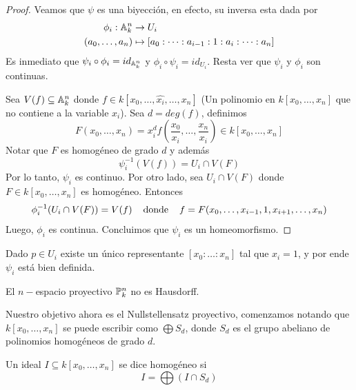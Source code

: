 \documentclass[11pt]{article}
\begin{document}
\begin{proof}
    Veamos que $\psi$ es una biyección, en efecto, su inversa esta dada por
    \begin{align*}
        \phi_{i}:\A_{k}^{n} &\to U_{i} \\
        (a_{0},\dots,a_{n}) &\mapsto [a_{0}:\dots:a_{i-1}:1:a_{i}:\dots:a_{n}]
    \end{align*}
    Es inmediato que $\psi_{i}\circ\phi_{i}=id_{\A_{k}^{n}}$ y $\phi_{i}\circ\psi_{i}=id_{U_{i}}$.
    Resta ver que $\psi_{i}$ y $\phi_{i}$ son continuas.

    \vspace{1mm}
    Sea $V(f)\subseteq\A_{k}^{n}$ donde $f\in k[x_{0},\dots,\hat{x_{i}},\dots,x_{n}]$ (Un 
    polinomio en $k[x_{0},\dots,x_{n}]$ que no contiene a la variable $x_{i}$). Sea $d=deg(f)$, 
    definimos
    \begin{equation*}
        F(x_{0},\dots,x_{n})
        =x_{i}^{d}f\left(\frac{x_{0}}{x_{i}},\dots,\frac{x_{n}}{x_{i}}\right)
        \in k[x_{0},\dots,x_{n}]
    \end{equation*}
    Notar que $F$ es homogéneo de grado $d$ y además
    \begin{equation*}
        \psi_{i}^{-1}(V(f))=U_{i}\cap V(F)
    \end{equation*}
    Por lo tanto, $\psi_{i}$ es continuo. Por otro lado, sea $U_{i}\cap V(F)$ donde 
    $F\in k[x_{0},\dots,x_{n}]$ es homogéneo. Entonces
    \begin{equation*}
        \phi_{i}^{-1}(U_{i}\cap V(F))=V(f) 
        \hhtext{donde}
        f=F(x_{0},\dots,x_{i-1},1,x_{i+1},\dots,x_{n})
    \end{equation*}
    Luego, $\phi_{i}$ es continua. Concluimos que $\psi_{i}$ es un homeomorfismo.
\end{proof}

\obs Dado $p\in U_{i}$ existe un único representante $[x_{0}:\dots:x_{n}]$ tal que $x_{i}=1$, y 
por ende $\psi_{i}$ está bien definida.

\begin{cor}
    El $n-$espacio proyectivo $\P_{k}^{n}$ no es Hausdorff.
\end{cor}

\noindent Nuestro objetivo ahora es el Nullstellensatz proyectivo, comenzamos notando que 
$k[x_{0},\dots,x_{n}]$ se puede escribir como $\bigoplus S_{d}$, donde $S_{d}$ es el grupo 
abeliano de polinomios homogéneos de grado $d$.

\begin{dfn}
    Un ideal $I\subseteq k[x_{0},\dots,x_{n}]$ se dice homogéneo si
    \begin{equation*}
        I=\bigoplus (I\cap S_{d})
    \end{equation*}
\end{dfn}
\end{document}
